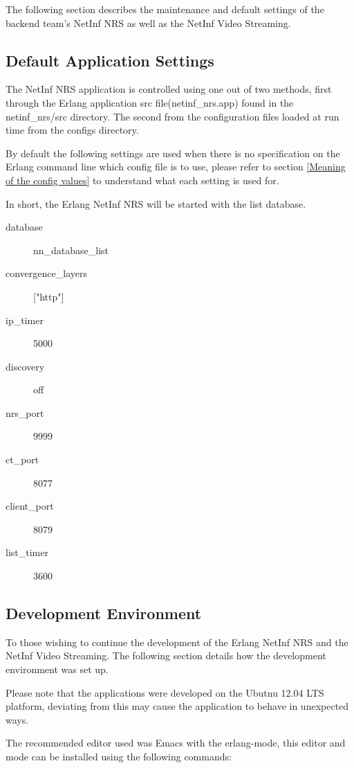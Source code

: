 The following section describes the maintenance and default settings of the backend team's NetInf NRS as well as the NetInf Video Streaming.

\subsection{Default Application Settings}

The NetInf NRS application is controlled using one out of two methods, first through the Erlang application src file(netinf\_nrs.app) 
found in the netinf\_nrs/src directory. The second from the configuration files loaded at run time from the configs directory. 

By default the following settings are used when there is no specification on the Erlang command line which config file is to use, 
please refer to section \ref{Meaning of the config values} to understand what each setting is used for. 

In short, the Erlang NetInf NRS will be started with the list database.

\begin{description}
\item[database]
nn\_database\_list
\item[convergence\_layers]
["http"]
\item[ip\_timer]
5000
\item[discovery]
off
\item[nrs\_port]
9999
\item[ct\_port]
8077
\item[client\_port]
8079
\item[list\_timer]
3600
\end{description}

\subsection {Development Environment}

To those wishing to continue the development of the Erlang NetInf NRS and the NetInf Video Streaming. The following 
section details how the development environment was set up. 

Please note that the applications were developed on the Ubutnu 12.04 LTS platform, deviating from this may cause the 
application to behave in unexpected ways.

The recommended editor used was Emacs with the erlang-mode, this editor and mode can be installed using the following commands:

